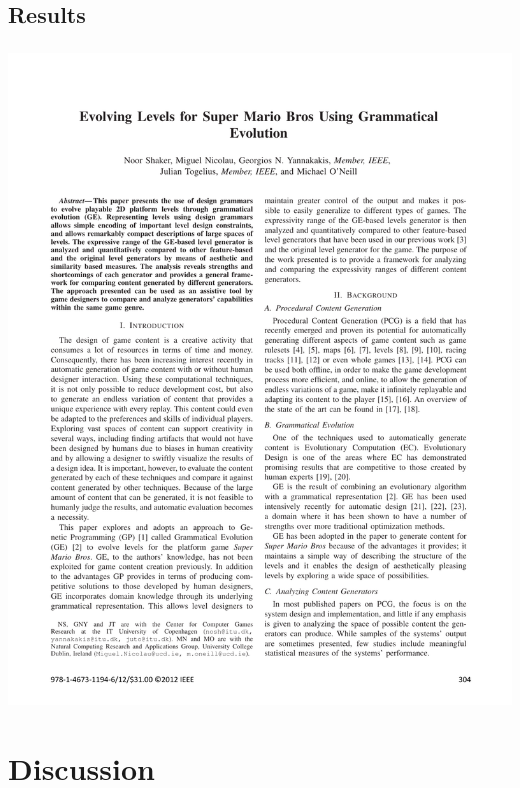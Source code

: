 \documentclass{beamer}
\makeatletter
\newcommand*{\currentname}{\@currentlabelname}
\makeatother
\begin{document}
\subsection{Results}
\begin{frame}
\frametitle{\currentname}
\includegraphics[page=5, trim={11cm 15.5cm 1.5cm 8cm}, clip, scale=1.1]{Mario_GE.pdf}\\
\end{frame}



\section{Discussion}
\end{document}
